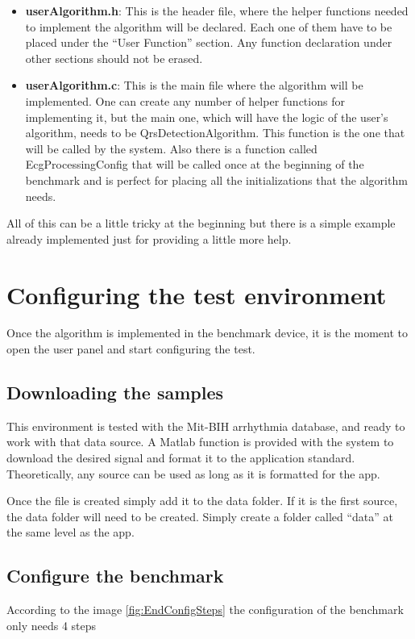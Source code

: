 \begin{itemize}
    \item \textbf{userAlgorithm.h}: This is the header file, where the helper functions needed to implement the algorithm will be declared. Each one of them have to be placed under the ``User Function'' section. Any function declaration under other sections should not be erased.
    \item \textbf{userAlgorithm.c}: This is the main file where the algorithm will be implemented. One can create any number of helper functions for implementing it, but the main one, which will have the logic of the user's algorithm, needs to be QrsDetectionAlgorithm. This function is the one that will be called by the system. Also there is a function called EcgProcessingConfig that will be called once at the beginning of the benchmark and is perfect for placing all the initializations that the algorithm needs. 
\end{itemize}

All of this can be a little tricky at the beginning but there is a simple example already implemented just for providing a little more help.

\clearpage
\section{Configuring the test environment}
Once the algorithm is implemented in the benchmark device, it is the moment to open the user panel and start configuring the test.

\subsection{Downloading the samples}
This environment is tested with the Mit-BIH arrhythmia database, and ready to work with that data source. A Matlab function is provided with the system to download the desired signal and format it to the application standard. Theoretically, any source can be used as long as it is formatted for the app.

Once the file is created simply add it to the data folder. If it is the first source, the data folder will need to be created. Simply create a folder called “data” at the same level as the app.


\subsection{Configure the benchmark}
According to the image \ref{fig:EndConfigSteps} the configuration of the benchmark only needs 4 steps

